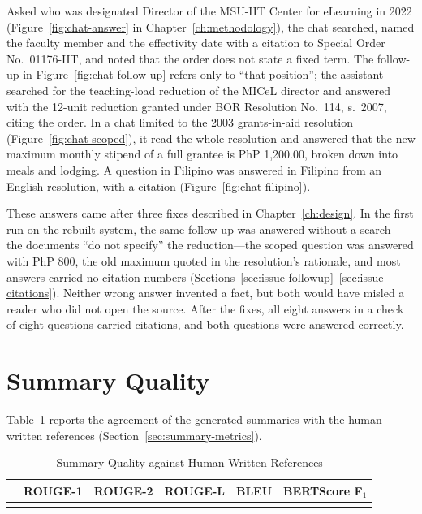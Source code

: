 Asked who was designated Director of the MSU-IIT Center for eLearning in 2022 (Figure~\ref{fig:chat-answer} in Chapter~\ref{ch:methodology}), the chat searched, named the faculty member and the effectivity date with a citation to Special Order No.~01176-IIT, and noted that the order does not state a fixed term. The follow-up in Figure~\ref{fig:chat-follow-up} refers only to ``that position''; the assistant searched for the teaching-load reduction of the MICeL director and answered with the 12-unit reduction granted under BOR Resolution No.~114, s.~2007, citing the order. In a chat limited to the 2003 grants-in-aid resolution (Figure~\ref{fig:chat-scoped}), it read the whole resolution and answered that the new maximum monthly stipend of a full grantee is PhP 1,200.00, broken down into meals and lodging. A question in Filipino was answered in Filipino from an English resolution, with a citation (Figure~\ref{fig:chat-filipino}).

These answers came after three fixes described in Chapter~\ref{ch:design}. In the first run on the rebuilt system, the same follow-up was answered without a search---the documents ``do not specify'' the reduction---the scoped question was answered with PhP 800, the old maximum quoted in the resolution's rationale, and most answers carried no citation numbers (Sections~\ref{sec:issue-followup}--\ref{sec:issue-citations}). Neither wrong answer invented a fact, but both would have misled a reader who did not open the source. After the fixes, all eight answers in a check of eight questions carried citations, and both questions were answered correctly.


\section{Summary Quality}\label{sec:summary-results}

Table~\ref{tab:summary-metrics} reports the agreement of the generated summaries with the human-written references (Section~\ref{sec:summary-metrics}).

\begin{table}[htbp]
  \centering
  \caption{Summary Quality against Human-Written References}\label{tab:summary-metrics}
  \begin{tabular}{@{}lccccc@{}}
    \toprule
    & \textbf{ROUGE-1} & \textbf{ROUGE-2} & \textbf{ROUGE-L} & \textbf{BLEU} & \textbf{BERTScore F$_1$} \\
    \midrule
    \cs{} & \TODO{} & \TODO{} & \TODO{} & \TODO{} & \TODO{} \\
    \bottomrule
  \end{tabular}
\end{table}

